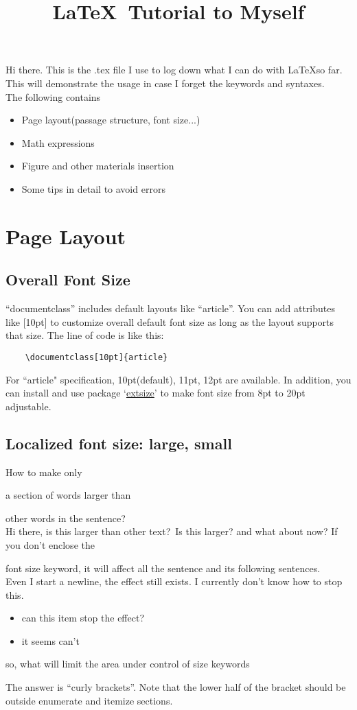 \documentclass[12pt]{article}
\begin{document}
	\tableofcontents
\title{\LaTeX \ Tutorial to Myself}
\maketitle
\noindent
Hi there. This is the .tex file I use to log down what I can do with \LaTeX so far.
\\This will demonstrate the usage in case I forget the keywords and syntaxes.
\\The following contains 
\begin{itemize}
	\item Page layout(passage structure, font size...)
	\item Math expressions
	\item Figure and other materials insertion
	\item Some tips in detail to avoid errors
\end{itemize}
\section{Page Layout}
	\subsection{Overall Font Size}
	``documentclass'' includes default layouts like ``article''. You can add attributes like [10pt] to customize overall default font size as long as the layout supports that size. The line of code is like this:
	\begin{lstlisting}
	\documentclass[10pt]{article}
	\end{lstlisting}
	For ``article" specification, 10pt(default), 11pt, 12pt are available.
	In addition, you can install and use package `\href{http://ctan.mirror.rafal.ca/macros/latex/contrib/extsizes/extsizes.pdf}{extsize}' to make font size from 8pt to 20pt adjustable.
	\subsection{Localized font size: large, small}
	How to make only \begin{LARGE}a section of words larger than\end{LARGE} other words in the sentence?
	\\Hi there, is this larger than other text?{\LARGE\ Is this larger?} and what about now?
	If you don't enclose the {\LARGE{font size keyword}, it will affect all the sentence and its following sentences.
		\\Even I start a newline, the effect still exists. I currently don't know how to stop this.
		\begin{itemize}
			\item can this item stop the effect?
			\item it seems can't
		\end{itemize}
		so, what will limit the area under control of size keywords}
	The answer is ``curly brackets''. Note that the lower half of the bracket should be outside enumerate and itemize sections.
\end{document}
